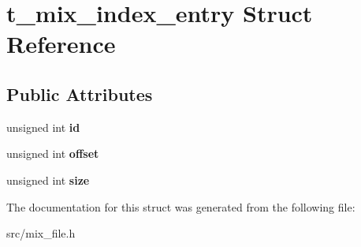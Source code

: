 \hypertarget{structt__mix__index__entry}{
\section{t\_\-mix\_\-index\_\-entry Struct Reference}
\label{structt__mix__index__entry}
}
\subsection*{Public Attributes}
\begin{DoxyCompactItemize}
\item 
\hypertarget{structt__mix__index__entry_ad69aa6eaf1c69dd2e46e4ffefa697d01}{
unsigned int {\bfseries id}}
\label{structt__mix__index__entry_ad69aa6eaf1c69dd2e46e4ffefa697d01}

\item 
\hypertarget{structt__mix__index__entry_ab175944b00017cd22a305680a9f915a1}{
unsigned int {\bfseries offset}}
\label{structt__mix__index__entry_ab175944b00017cd22a305680a9f915a1}

\item 
\hypertarget{structt__mix__index__entry_a6991b2b6361cd9b05b22c16a1b06f612}{
unsigned int {\bfseries size}}
\label{structt__mix__index__entry_a6991b2b6361cd9b05b22c16a1b06f612}

\end{DoxyCompactItemize}


The documentation for this struct was generated from the following file:\begin{DoxyCompactItemize}
\item 
src/mix\_\-file.h\end{DoxyCompactItemize}
